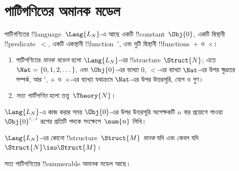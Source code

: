 \documentclass[../../../include/open-logic-section]{subfiles}
\begin{document}
\section{পাটিগণিতের অমানক মডেল}

\begin{defn}
পাটিগণিতের !!{language}~$\Lang{L_N}$-এ আছে একটি !!{constant}~$\Obj{0}$,
একটি দ্বিস্থানী !!{predicate}~$<$, একটি একস্থানী !!{function}~$\prime$,
এবং দুটি দ্বিস্থানী !!{function}s~$+$ ও~$\times$।
\begin{enumerate}
\item পাটিগণিতের \emph{মানক মডেল} হলো $\Lang{L_N}$-এর !!{structure}
  $\Struct{N}$; এতে $\Nat = \{ 0, 1, 2, \dots\}$, এবং
  $\Obj{0}$-এর ব্যাখ্যা $0$, $<$-এর ব্যাখ্যা $\Nat$-এর উপর ক্ষুদ্রতর
  সম্পর্ক, আর $\prime$, $+$ ও~$\times$-এর ব্যাখ্যা যথাক্রমে $\Nat$-এর
  উপর উত্তরসূরি, যোগ ও গুণ।
\item \emph{সত্য পাটিগণিত} হলো তত্ত্ব~$\Theory{N}$।
\end{enumerate}
\end{defn}

$\Lang{L_N}$-এ কাজ করার সময় $\Obj{0}$-এর উপর উত্তরসূরি অপেক্ষকটি
$n$ বার প্রয়োগে পাওয়া $\Obj{0}^{\prime\dots\prime}$ রূপের প্রতিটি
পদকে সংক্ষেপে~$\num{n}$ লিখি।

\begin{defn}
$\Lang{L_N}$-এর কোনো !!{structure}~$\Struct{M}$ \emph{মানক} যদি এবং
কেবল যদি $\Struct{N} \iso \Struct{M}$।
\end{defn}

\begin{thm}
সত্য পাটিগণিতের !!{enumerable} অমানক মডেল আছে।
\end{thm}
\end{document}
